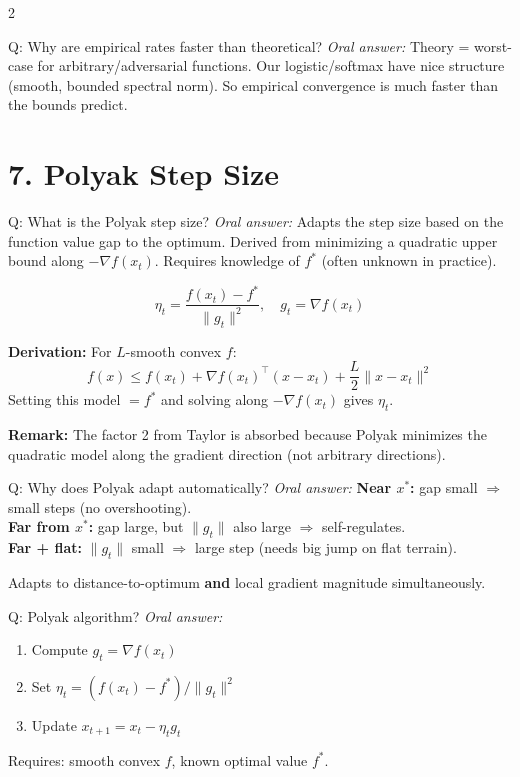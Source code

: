 \documentclass[a4paper,9pt]{article}
\newcommand{\oral}{\textit{\color{darkgray}Oral answer: }}
\begin{document}
\begin{multicols}{2}
\begin{qa}{Q: Why are empirical rates faster than theoretical?}
\oral Theory = worst-case for arbitrary/adversarial functions. 
Our logistic/softmax have nice structure (smooth, bounded spectral norm). 
So empirical convergence is much faster than the bounds predict.
\end{qa}

\section{7. Polyak Step Size}

\begin{qa}{Q: What is the Polyak step size?}
\oral Adapts the step size based on the function value gap to the optimum.
Derived from minimizing a quadratic upper bound along \(-\nabla f(x_t)\).
Requires knowledge of \(f^*\) (often unknown in practice).

\[
\eta_t = \frac{f(x_t) - f^*}{\|g_t\|^2}, \quad g_t = \nabla f(x_t)
\]

\textbf{Derivation:} For \(L\)-smooth convex \(f\):
\[
f(x) \leq f(x_t) + \nabla f(x_t)^\top(x-x_t) + \frac{L}{2}\|x-x_t\|^2
\]
Setting this model \(= f^*\) and solving along \(-\nabla f(x_t)\) gives \(\eta_t\).

\textbf{Remark:} The factor 2 from Taylor is absorbed because Polyak minimizes the quadratic model along the gradient direction (not arbitrary directions).
\end{qa}

\begin{qa}{Q: Why does Polyak adapt automatically?}
\oral \textbf{Near \(x^*\):} gap small \(\Rightarrow\) small steps (no overshooting).\\
\textbf{Far from \(x^*\):} gap large, but \(\|g_t\|\) also large \(\Rightarrow\) self-regulates.\\
\textbf{Far + flat:} \(\|g_t\|\) small \(\Rightarrow\) large step (needs big jump on flat terrain).

Adapts to distance-to-optimum \textbf{and} local gradient magnitude simultaneously.
\end{qa}

\begin{qa}{Q: Polyak algorithm?}
\oral
\begin{enumerate}[nosep]
\item Compute \(g_t = \nabla f(x_t)\)
\item Set \(\eta_t = (f(x_t) - f^*) / \|g_t\|^2\)
\item Update \(x_{t+1} = x_t - \eta_t g_t\)
\end{enumerate}
Requires: smooth convex \(f\), known optimal value \(f^*\).
\end{qa}


\end{multicols}
\end{document}
